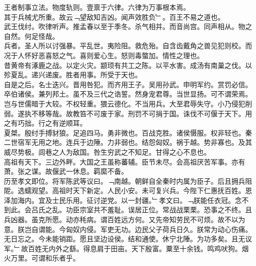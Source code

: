 \documentclass{zhvt-classic}
\begin{document}





\hspace*{2em}王者制事立法。物度轨则。壹禀于六律。六律为万事根本焉。\\
\hspace*{2em}其于兵械尤所重。故云﹁望敌知吉凶。闻声效胜负﹂。百王不易之道也。\\
\hspace*{2em}武王伐纣。吹律听声。推孟春以至于季冬。杀气相并。而音尚宫。同声相从。物之自然。何足怪哉。\\
\hspace*{2em}兵者。圣人所以讨强暴。平乱世。夷险阻。救危殆。自含齿戴角之兽见犯则校。而况于人怀好恶喜怒之气。喜则爱心生。怒则毒螫加。情性之理也。\\
\hspace*{2em}昔黄帝有涿鹿之战。以定火灾。颛顼有共工之陈。以平水害。成汤有南巢之伐。以殄夏乱。递兴递废。胜者用事。所受于天也。\\
\hspace*{2em}自是之后。名士迭兴。晋用咎犯。而齐用王子。吴用孙武。申明军约。赏罚必信。卒伯诸侯。兼列邦土。虽不及三代之诰誓。然身宠君尊。当世显扬。可不谓荣焉。岂与世儒暗于大较。不权轻重。猥云德化。不当用兵。大至君辱失守。小乃侵犯削弱。遂执不移等哉。故教笞不可废于家。刑罚不可捐于国。诛伐不可偃于天下。用之有巧拙。行之有逆顺耳。\\
\hspace*{2em}夏桀。殷纣手搏豺狼。足追四马。勇非微也。百战克胜。诸侯慑服。权非轻也。秦二世宿军无用之地。连兵于边陲。力非弱也。结怨匈奴。祸于越。势非寡也。及其威尽势极。闾巷之人为敌国。咎生穷武之不知足。甘得之心不息也。\\
\hspace*{2em}高祖有天下。三边外畔。大国之王虽称蕃辅。臣节未尽。会高祖厌苦军事。亦有萧。张之谋。故偃武一休息。羁縻不备。\\
\hspace*{2em}历至孝文即位。将军陈武等议曰。﹁南越。朝鲜自全秦时内属为臣子。后且拥兵阻阸。选蠕观望。高祖时天下新定。人民小安。未可复兴兵。今陛下仁惠抚百姓。恩泽加海内。宜及士民乐用。征讨逆党。以一封疆。﹂孝文曰。﹁朕能任衣冠。念不到此。会吕氏之乱。功臣宗室共不羞耻。误居正位。常战战栗栗。恐事之不终。且兵凶器。虽克所愿。动亦秏病。谓百姓远方何。又先帝知劳民不可烦。故不以为意。朕岂自谓能。今匈奴内侵。军吏无功。边民父子荷兵日久。朕常为动心伤痛。无日忘之。今未能销距。愿且坚边设侯。结和通使。休宁北陲。为功多矣。且无议军。﹂故百姓无内外之繇。得息肩于田亩。天下殷富。粟至十余钱。鸣鸡吠狗。烟火万里。可谓和乐者乎。\\
\end{document}
